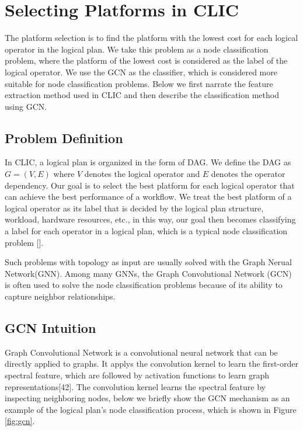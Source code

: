 
\section{Selecting Platforms in CLIC}


The platform selection is to find the platform with the lowest cost for each logical operator in the logical plan. 
We take this problem as a node classification problem, where the platform of the lowest cost is considered as the label of the logical operator. 
We use the GCN as the classifier, which is considered more suitable for node classification problems. 
Below we first narrate the feature extraction method used in CLIC and then describe the classification method using GCN.


\subsection{Problem Definition}
In CLIC, a logical plan is organized in the form of DAG. 
We define the DAG as  $G = (V, E)$ where $V$ denotes the logical operator and $E$ denotes the operator dependency.
Our goal is to select the best platform for each logical operator that can achieve the best performance of a workflow. 
We treat the best platform of a logical operator as its label that is decided by the logical plan structure, workload, hardware resources, etc., 
in this way, our goal then becomes classifying a label for each operator in a logical plan, which is a typical node classification problem [].

Such problems with topology as input are usually solved with the Graph Nerual Network(GNN). 
Among many GNNs, the Graph Convolutional Network (GCN) is often used to solve the node classification problems because of its ability to capture neighbor relationships.

\subsection{GCN Intuition}

Graph Convolutional Network is a convolutional neural network that can be directly applied to graphs. 
It applys the convolution kernel to learn the first-order spectral feature, which are followed by activation functions to learn graph representations[42]. 
The convolution kernel learns the spectral feature by inspecting neighboring nodes, below we briefly show the GCN mechanism as an example of the logical plan's node classification process, which is shown in Figure \ref{fig:gcn}.

